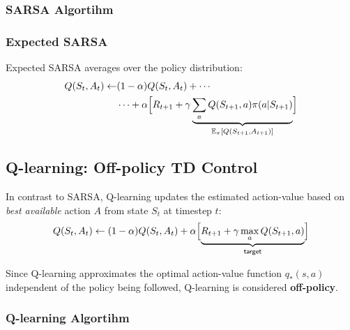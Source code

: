 \subsubsection{SARSA Algortihm}
\begin{algorithmic}
    \EndWhile{}
    \EndFor{}
\end{algorithmic}

\subsubsection{Expected SARSA}
Expected SARSA averages over the policy distribution:
\noindent\begin{align*}
    Q(S_t, A_t) \gets & (1-\alpha)Q(S_t, A_t) + \cdots                                                                                                                       \\
                      & \cdots + \alpha \Bigl[R_{t+1} + \gamma \underbrace{\sum_{a} Q(S_{t+1}, a) \pi(a| S_{t+1})}_{\mathbb{E}_\pi \left[ Q(S_{t+1}, A_{t+1})\right]} \Bigr]
\end{align*}

\subsection{Q-learning: Off-policy TD Control}
In contrast to SARSA, Q-learning updates the estimated action-value based on \textit{best available} action $A$ from state $S_t$ at timestep $t$:
\noindent\begin{equation*}
    Q(S_t, A_t) \gets (1-\alpha)Q(S_t, A_t) + \alpha \Bigl[\underbrace{R_{t+1} + \gamma \max_a Q(S_{t+1}, a)}_{\textsf{target}} \Bigr]
\end{equation*}

Since Q-learning approximates the optimal action-value function $q_*(s,a)$ independent of the policy being followed, Q-learning is considered \textbf{off-policy}.
\subsubsection{Q-learning Algortihm}
\begin{algorithmic}
    \EndWhile{}
    \EndFor{}
\end{algorithmic}